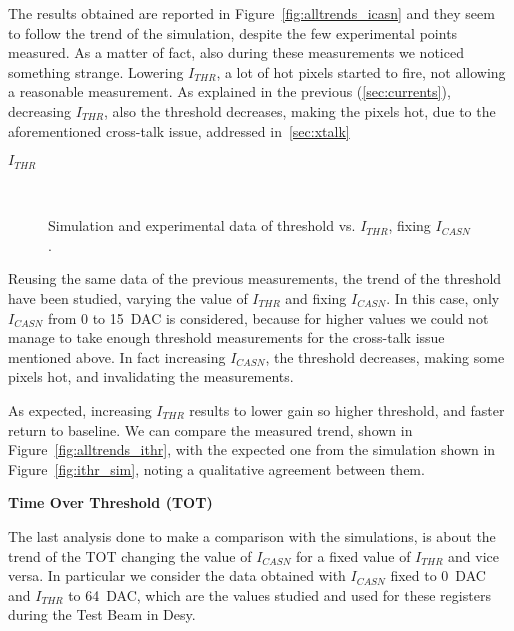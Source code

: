 The results obtained are reported in Figure~\autoref{fig:alltrends_icasn} and they seem to follow the trend of the simulation, despite the few experimental points measured. As a matter of fact, also during these measurements we noticed something strange. Lowering $I_{THR}$, a lot of hot pixels started to fire, not allowing a reasonable measurement. As explained in the previous (\autoref{sec:currents}), decreasing $I_{THR}$, also the threshold decreases, making the pixels hot, due to the aforementioned cross-talk issue, addressed in~\autoref{sec:xtalk}

\begin{description}
\item[\textbf{$I_{THR}$}]
\end{description}

\begin{figure}[h!]
\centering
{}\quad
{}\\
\caption{Simulation and experimental data of threshold vs. $I_{THR}$, fixing $I_{CASN}$.}
\end{figure}

Reusing the same data of the previous measurements, the trend of the threshold have been studied, varying the value of $I_{THR}$ and fixing $I_{CASN}$.
In this case, only $I_{CASN}$ from 0 to \SI{15}{DAC} is considered, because for higher values we could not manage to take enough threshold measurements for the cross-talk issue mentioned above. In fact increasing $I_{CASN}$, the threshold decreases, making some pixels hot, and invalidating the measurements.

As expected, increasing $I_{THR}$ results to lower gain so higher threshold, and faster return to baseline. 
We can compare the measured trend, shown in Figure~\autoref{fig:alltrends_ithr}, with the expected one from the simulation shown in Figure~\autoref{fig:ithr_sim}, noting a qualitative agreement between them.


\begin{description}
\item[\textbf{Time Over Threshold (TOT)}]
\end{description}

The last analysis done to make a comparison with the simulations, is about the trend of the TOT changing the value of $I_{CASN}$ for a fixed value of $I_{THR}$ and vice versa. In particular we consider the data obtained with $I_{CASN}$ fixed to \SI{0}{DAC} and $I_{THR}$ to \SI{64}{DAC}, which are the values studied and used for these registers during the Test Beam in Desy.

